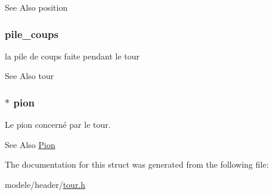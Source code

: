 \begin{DoxySeeAlso}{See Also}
position 
\end{DoxySeeAlso}
\hypertarget{struct_tour_a1e132b1253290931353c35b732b490bf}{
\subsubsection[{pile\-\_\-coups}]{ pile\-\_\-coups}}\label{struct_tour_a1e132b1253290931353c35b732b490bf}


la pile de coups faite pendant le tour 

\begin{DoxySeeAlso}{See Also}
tour 
\end{DoxySeeAlso}
\hypertarget{struct_tour_a0224d782f98071941365738119daa136}{
\subsubsection[{pion}]{$\ast$ pion}}\label{struct_tour_a0224d782f98071941365738119daa136}


Le pion concerné par le tour. 

\begin{DoxySeeAlso}{See Also}
\hyperlink{struct_pion}{Pion} 
\end{DoxySeeAlso}


The documentation for this struct was generated from the following file\-:\begin{DoxyCompactItemize}
\item 
modele/header/\hyperlink{tour_8h}{tour.\-h}\end{DoxyCompactItemize}
